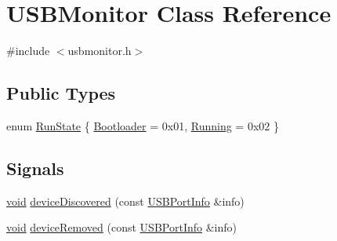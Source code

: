 \hypertarget{class_u_s_b_monitor}{\section{\-U\-S\-B\-Monitor \-Class \-Reference}
\label{class_u_s_b_monitor}
}


{\ttfamily \#include $<$usbmonitor.\-h$>$}

\subsection*{\-Public \-Types}
\begin{DoxyCompactItemize}
\item 
enum \hyperlink{group___raw_h_i_d_plugin_gaff6bf8945a7cdab907cf5adc29bec064}{\-Run\-State} \{ \hyperlink{group___raw_h_i_d_plugin_ggaff6bf8945a7cdab907cf5adc29bec064ac18f9b621b18e8d33c36467a92dd0dc9}{\-Bootloader} =  0x01, 
\hyperlink{group___raw_h_i_d_plugin_ggaff6bf8945a7cdab907cf5adc29bec064a1a9efe940184d4bec69cb5d343eaaf81}{\-Running} =  0x02
 \}
\end{DoxyCompactItemize}
\subsection*{\-Signals}
\begin{DoxyCompactItemize}
\item 
\hyperlink{group___u_a_v_objects_plugin_ga444cf2ff3f0ecbe028adce838d373f5c}{void} \hyperlink{group___raw_h_i_d_plugin_gab2f32b160f38299dd97b8bce113ac016}{device\-Discovered} (const \hyperlink{struct_u_s_b_port_info}{\-U\-S\-B\-Port\-Info} \&info)
\item 
\hyperlink{group___u_a_v_objects_plugin_ga444cf2ff3f0ecbe028adce838d373f5c}{void} \hyperlink{group___raw_h_i_d_plugin_ga2184059e85771292590afbb9087ee225}{device\-Removed} (const \hyperlink{struct_u_s_b_port_info}{\-U\-S\-B\-Port\-Info} \&info)
\end{DoxyCompactItemize}
